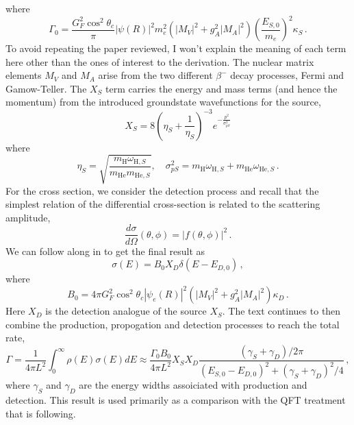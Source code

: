 \documentclass[10pt]{article}
\begin{document}
where
\begin{equation}
  \Gamma_{0} = \frac{G^{2}_{F}\cos^{2}\theta_{c}}{\pi}|\psi(R)|^{2}m_{e}^{2}(|M_{V}|^{2}+g^{2}_{A}|M_{A}|^{2})\left(\frac{E_{S,0}}{m_{e}}\right)^{2}\kappa_{S}\, .
\end{equation}
To avoid repeating the paper reviewed, I won't explain the meaning of each term here other than the ones of interest to the derivation. The nuclear matrix elements $M_{V}$ and $M_{A}$ arise from the two different $\beta^{-}$ decay processes, Fermi and Gamow-Teller. The $X_{S}$ term carries the energy and mass terms (and hence the momentum) from the introduced groundstate wavefunctions for the source,
\begin{equation}
  X_{S} = 8\left(\eta_{S} + \frac{1}{\eta_{S}}\right)^{-3}e^{-\frac{p^{2}}{\sigma_{pS}^{2}}}
\end{equation}
where
\begin{equation}
  \eta_{S} = \sqrt{\frac{m_{\text{H}}\omega_{\text{H},S}}{m_{\text{He}}m_{\text{He},S}}}, \quad \sigma^{2}_{pS} = m_{\text{H}}\omega_{\text{H},S} + m_{\text{He}}\omega_{\text{He},S}\, .
\end{equation}
For the cross section, we consider the detection process and recall that the simplest relation of the differential cross-section is related to the scattering amplitude,
\begin{equation}
  \frac{d\sigma}{d\Omega}(\theta, \phi) = |f(\theta,\phi)|^{2}\, .
\end{equation}
We can follow along in \cite{bahcall, Akhmedov_2008} to get the final result as
\begin{equation}
  \sigma(E) = B_{0}X_{D}\delta(E - E_{D,0})\, ,
\end{equation}
where
\begin{equation}
  B_{0} = 4\pi G_{F}^{2}\cos^{2}\theta_{c}|\psi_{e}(R)|^{2}(|M_{V}|^{2} + g_{A}^{2}|M_{A}|^{2})\kappa_{D}\, .
\end{equation}
Here $X_{D}$ is the detection analogue of the source $X_{S}$. The text continues to then combine the production, propogation and detection processes to reach the total rate,
\begin{equation}
  \Gamma = \frac{1}{4\pi L^{2}}\int_{0}^{\infty}\rho(E)\sigma(E)dE \approx \frac{\Gamma_{0}B_{0}}{4\pi L^{2}}X_{S}X_{D}\frac{(\gamma_{S} + \gamma_{D})/2\pi}{(E_{S,0} - E_{D,0})^{2} + (\gamma_{S} + \gamma_{D})^{2}/4}\, ,
\end{equation}
where $\gamma_{S}$ and $\gamma_{D}$ are the energy widths assoiciated with production and detection. This result is used primarily as a comparison with the QFT treatment that is following.
\end{document}
